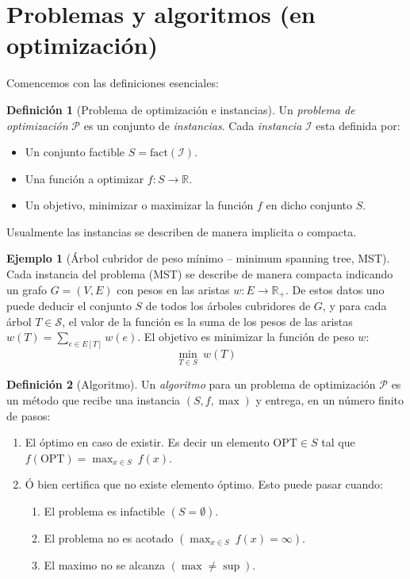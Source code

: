\documentclass[10pt]{article}
\newcommand{\RR}{\mathbb R}
\newcommand{\OPT}{\mathrm{OPT}}
\theoremstyle{plain}
\theoremstyle{definition}
\newtheorem{defi}{Definición}
\newtheorem{eje}{Ejemplo}
\begin{document}
\section{Problemas y algoritmos (en optimización)}
Comencemos con las definiciones esenciales:

\begin{defi}[Problema de optimización e instancias]
Un \emph{problema de optimización} $\mathcal{P}$ es un conjunto de \emph{instancias}. Cada \emph{instancia} $\mathcal{I}$ esta definida por:
\begin{itemize}
    \item Un conjunto factible $S=\text{fact}(\mathcal{I})$.
    \item Una función a optimizar $f\colon S\to \RR$.
    \item Un objetivo, minimizar o maximizar   la función $f$ en dicho conjunto $S$.
\end{itemize}

\end{defi}
Usualmente las instancias se describen de manera implicita o compacta.

\begin{eje}[Árbol cubridor de peso mínimo -- minimum spanning tree, MST]
Cada instancia del problema (MST) se describe de manera compacta indicando un grafo $G=(V,E)$ con pesos en las aristas $w\colon E \to \RR_+$. De estos datos uno puede deducir el conjunto $S$ de todos los árboles cubridores de $G$, y para cada árbol $T\in \mathcal{S}$, el valor de la función es la suma de los pesos de las aristas $w(T)=\sum_{e\in E[T]}w(e)$. El objetivo es minimizar la función de peso $w$:
\[ \min\limits_{T\in S}~  w(T) \]
\end{eje}

\begin{defi}[Algoritmo] Un \emph{algoritmo} para un problema de optimización $\mathcal{P}$  es un método que recibe una instancia $(S,f,\max)$ y entrega, en un número finito de pasos:
\begin{enumerate}
    \item El óptimo en caso de existir. Es decir un elemento $\OPT \in S$ tal que $f\left(\OPT\right)= \displaystyle{\max_{x\in S}}~f(x)$.
    \item Ó bien certifica que no existe elemento óptimo. Esto puede pasar cuando:
        \begin{enumerate}
            \item El problema es infactible $\left(S=\emptyset\right)$.
            \item El problema no es acotado $\left(\displaystyle{\max_{x \in S}}~f(x)= \infty\right)$.
            \item El maximo no se alcanza $\left(\max \neq \sup\right)$.
        \end{enumerate}
\end{enumerate}
\end{defi}
\end{document}
